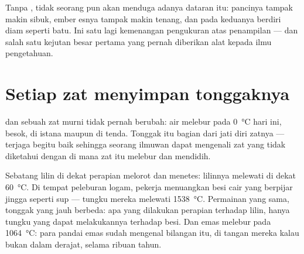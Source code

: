 \begin{remark}\label{rem:g4:changes-of-state:invisible}
Tanpa , tidak seorang pun akan menduga adanya dataran itu:
pancinya tampak makin sibuk, ember esnya tampak makin tenang, dan 
pada keduanya berdiri diam seperti batu. Ini satu lagi kemenangan
pengukuran atas penampilan --- dan salah satu kejutan besar pertama
yang pernah diberikan alat kepada ilmu pengetahuan.
\end{remark}

\section{Setiap zat menyimpan tonggaknya}

\begin{proposition}\label{prop:g4:changes-of-state:identity}
 dan  sebuah zat murni tidak pernah berubah: air
melebur pada \qty{0}{\celsius} hari ini, besok, di istana maupun di
tenda. Tonggak itu bagian dari jati diri zatnya --- terjaga begitu
baik sehingga seorang ilmuwan dapat mengenali zat yang tidak diketahui
dengan  di mana zat itu melebur dan mendidih.
\end{proposition}

\begin{example}\label{ex:g4:changes-of-state:foundry}
Sebatang lilin di dekat perapian melorot dan menetes: lilinnya
melewati  di dekat \qty{60}{\celsius}. Di tempat
peleburan logam, pekerja menuangkan besi cair yang berpijar jingga
seperti sup --- tungku mereka melewati \qty{1538}{\celsius}. Permainan
yang sama, tonggak yang jauh berbeda: apa yang dilakukan perapian
terhadap lilin, hanya tungku yang dapat melakukannya terhadap besi.
Dan emas melebur pada \qty{1064}{\celsius}: para pandai emas sudah
mengenal bilangan itu, di tangan mereka kalau bukan dalam derajat,
selama ribuan tahun.
\end{example}

